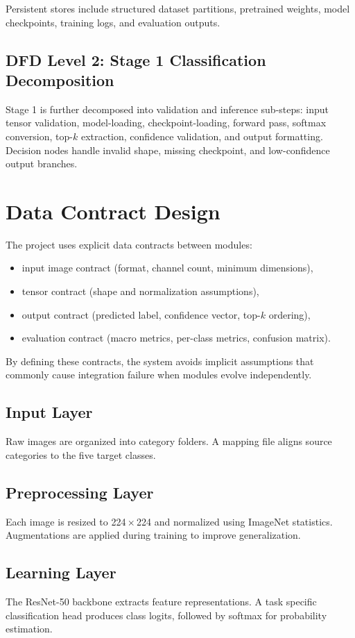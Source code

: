 Persistent stores include structured dataset partitions, pretrained weights, model checkpoints, training logs, and evaluation outputs.

\subsection{DFD Level 2: Stage 1 Classification Decomposition}
Stage 1 is further decomposed into validation and inference sub-steps: input tensor validation, model-loading, checkpoint-loading, forward pass, softmax conversion, top-$k$ extraction, confidence validation, and output formatting. Decision nodes handle invalid shape, missing checkpoint, and low-confidence output branches.

\section{Data Contract Design}
The project uses explicit data contracts between modules:
\begin{itemize}
\item input image contract (format, channel count, minimum dimensions),
\item tensor contract (shape and normalization assumptions),
\item output contract (predicted label, confidence vector, top-$k$ ordering),
\item evaluation contract (macro metrics, per-class metrics, confusion matrix).
\end{itemize}

By defining these contracts, the system avoids implicit assumptions that commonly cause integration failure when modules evolve independently.

\subsection{Input Layer}
Raw images are organized into category folders. A mapping file aligns source categories to the five target classes.

\subsection{Preprocessing Layer}
Each image is resized to 224\,$\times$\,224 and normalized using ImageNet statistics. Augmentations are applied during training to improve generalization.

\subsection{Learning Layer}
The ResNet-50 backbone extracts feature representations. A task specific classification head produces class logits, followed by softmax for probability estimation.

